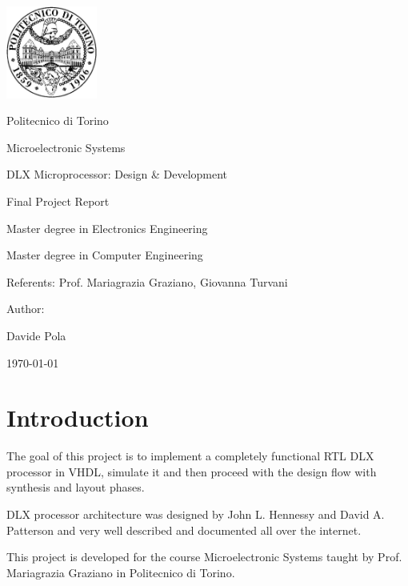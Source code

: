 \documentclass[12pt]{article}
\begin{document}
\begin{titlepage}
	\centerline{
		\includegraphics[width=3cm]{images/logopoli.eps}} 
	\vspace{0.5cm}
	\centerline{\LARGE Politecnico di Torino}
	\vspace{1.5cm}
	\centerline{\huge\sf Microelectronic Systems}
	\vspace{1cm}
	\centerline{\Huge\sf DLX Microprocessor: Design \& Development}
	\bigskip
	\centerline{\huge\sf Final Project Report}
	\vspace{2cm}
	\centerline{\Large Master degree in Electronics Engineering}
	\bigskip
	\centerline{\Large Master degree in Computer Engineering}
	\vspace{1.5cm}
	\centerline{\large Referents: Prof. Mariagrazia Graziano, Giovanna Turvani}
	\vspace{0.75cm}
	\centerline{\large Author:}
	\bigskip
	\centerline{\large Davide Pola}
	\vspace{2cm}
	\centerline{\large \today}
\end{titlepage}

\tableofcontents
\newpage
\section{Introduction}
The goal of this project is to implement a completely functional RTL DLX processor in VHDL, simulate it and then proceed with the design flow with synthesis and layout phases.

DLX processor architecture was designed by John L. Hennessy and David A. Patterson\cite{Patterson:1990:CAQ:77493} and very well described and documented all over the internet.

This project is developed for the course Microelectronic Systems taught by Prof. Mariagrazia Graziano in Politecnico di Torino\cite{MGLECTURENOTES}.
\end{document}
